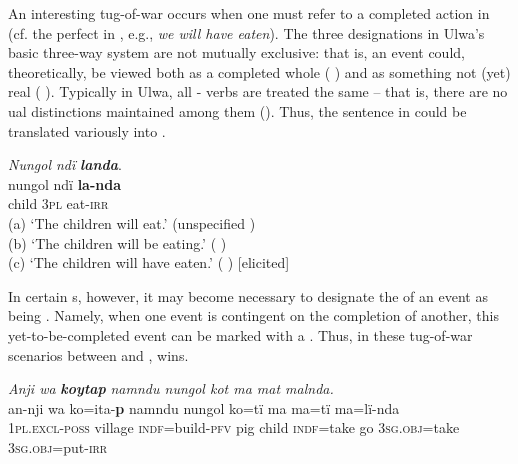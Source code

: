 
An interesting tug-of-war occurs when one must refer to a completed action in   (cf. the  perfect in , e.g., \textit{we will have eaten}). The three designations in Ulwa’s basic three-way  system are not mutually exclusive: that is, an event could, theoretically, be viewed both as a completed whole ( ) and as something not (yet) real ( ). Typically in Ulwa, all - verbs are treated the same -- that is, there are no ual distinctions maintained among them (). Thus, the sentence in  could be translated variously into .

\ea%
    \label{ex:verbs:55}
          \textit{Nungol ndï} \textbf{\textit{landa}}.\\
\gll nungol  ndï  \textbf{la-nda}\\
    child  3\textsc{pl}  eat-\textsc{irr}\\
\glt    (a) ‘The children will eat.’ (unspecified )\\
    (b) ‘The children will be eating.’ ( )\\
    (c) ‘The children will have eaten.’ ( ) [elicited]
\z

In certain s, however, it may become necessary to designate the  of an  event as being . Namely, when one  event is contingent on the completion of another, this yet-to-be-completed event can be marked with a   . Thus, in these tug-of-war scenarios between  and ,  wins.

\newpage

\ea%
    \label{ex:verbs:56}
              \textit{Anji wa} \textbf{\textit{koytap}} \textit{namndu nungol kot ma mat malnda.}\\

    \gll an-nji        wa     ko=ita-\textbf{p}      namndu  nungol ko=tï     ma  ma=tï      ma=lï-nda\\
    1\textsc{pl.excl-poss}  village  \textsc{indf}=build-\textsc{pfv}  pig      child   \textsc{indf}=take  go  \textsc{3sg.obj}=take  3\textsc{sg.obj}=put-\textsc{irr}\\


